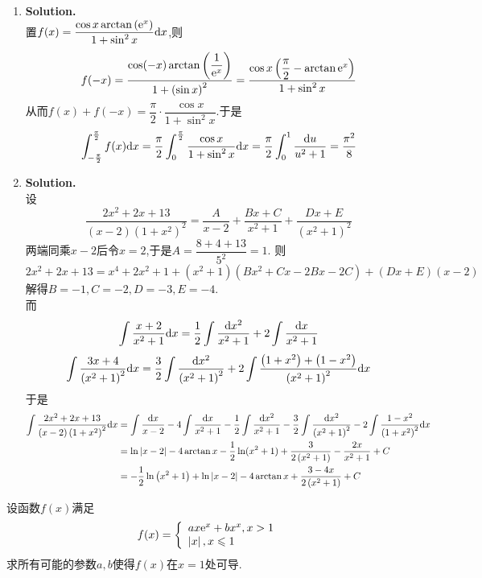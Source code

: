 \documentclass{ctexart}
\begin{document}
\begin{solution}
    \begin{enumerate}[label=\textbf{(\arabic*)}]
        \item \textbf{Solution.}\\
            置$f(x)=\dfrac{\cos x\arctan\left(\mathrm{e}^x\right)}{1+\sin^2x}\mathrm{d} x$,则
            $$f(-x)=\dfrac{\cos(-x)\arctan\left(\dfrac{1}{\mathrm{e}^x}\right)}{1+\left(\sin x\right)^2}=\dfrac{\cos x\left(\dfrac{\pi}{2}-\arctan\mathrm{e}^x\right)}{1+\sin^2x}$$
            从而$f(x)+f(-x)=\dfrac{\pi}{2}\cdot\dfrac{\cos x}{1+\sin^2x}$.于是
            $$\int_{-\frac{\pi}{2}}^{\frac{\pi}{2}}f(x)\mathrm{d} x=\dfrac{\pi}{2}\int_{0}^{\frac{\pi}{2}}\dfrac{\cos x}{1+\sin^2x}\mathrm{d} x=\dfrac{\pi}{2}\int_0^1\dfrac{\mathrm{d} u}{u^2+1}=\dfrac{\pi^2}{8}$$
        \item \textbf{Solution.}\\
            设$$\dfrac{2x^2+2x+13}{(x-2)\left(1+x^2\right)^2}=\dfrac{A}{x-2}+\dfrac{Bx+C}{x^2+1}+\dfrac{Dx+E}{\left(x^2+1\right)^2}$$
            两端同乘$x-2$后令$x=2$,于是$A=\dfrac{8+4+13}{5^2}=1$.
            则$$2x^2+2x+13=x^4+2x^2+1+\left(x^2+1\right)\left(Bx^2+Cx-2Bx-2C\right)+(Dx+E)(x-2)$$
            解得$B=-1,C=-2,D=-3,E=-4$.\\
            而$$\int\dfrac{x+2}{x^2+1}\mathrm{d} x=\dfrac{1}{2}\int\dfrac{\mathrm{d} x^2}{x^2+1}+2\int\dfrac{\mathrm{d} x}{x^2+1}$$
            $$\int\dfrac{3x+4}{\left(x^2+1\right)^2}\mathrm{d} x=\dfrac{3}{2}\int\dfrac{\mathrm{d} x^2}{\left(x^2+1\right)^2}+2\int\dfrac{\left(1+x^2\right)+\left(1-x^2\right)}{\left(x^2+1\right)^2}\mathrm{d} x$$
            于是$$\begin{aligned}
                \int\dfrac{2x^2+2x+13}{(x-2)\left(1+x^2\right)^2}\mathrm{d} x
                &= \int\dfrac{\mathrm{d} x}{x-2}-4\int\dfrac{\mathrm{d} x}{x^2+1}-\dfrac{1}{2}\int\dfrac{\mathrm{d} x^2}{x^2+1}-\dfrac{3}{2}\int\dfrac{\mathrm{d} x^2}{\left(x^2+1\right)^2}-2\int\dfrac{1-x^2}{\left(1+x^2\right)^2}\mathrm{d} x \\
                &= \ln\left|x-2\right|-4\arctan x-\dfrac{1}{2}\ln(x^2+1)+\dfrac{3}{2\left(x^2+1\right)}-\dfrac{2x}{x^2+1}+C\\
                &= -\dfrac{1}{2}\ln\left(x^2+1\right)+\ln\left|x-2\right|-4\arctan x+\dfrac{3-4x}{2\left(x^2+1\right)}+C
            \end{aligned}$$
    \end{enumerate}
\end{solution}
\begin{problem}[4.(8\songti{分})]
    设函数$f(x)$满足$$f(x)=\left\{\begin{array}{l}ax\mathrm{e}^x+bx^x,x>1\\\left|x\right|,x\leqslant1\end{array}\right.$$
    求所有可能的参数$a,b$使得$f(x)$在$x=1$处可导.
\end{problem}
\end{document}
